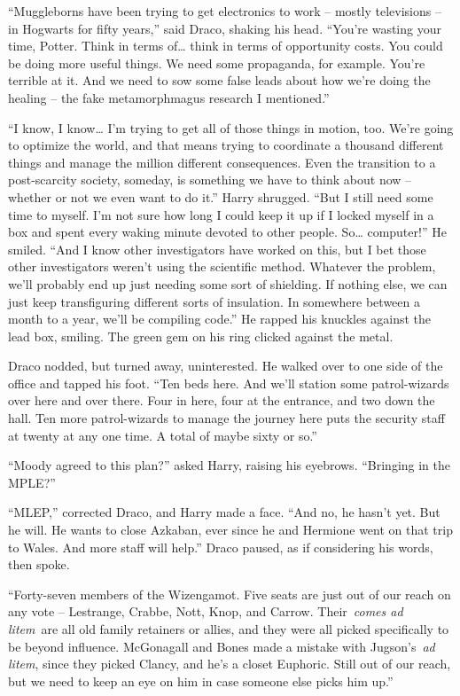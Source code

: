 ``Muggleborns have been trying to get electronics to work -- mostly
televisions -- in Hogwarts for fifty years,'' said Draco, shaking his
head. ``You're wasting your time, Potter. Think in terms of\ldots{}
think in terms of opportunity costs. You could be doing more useful
things. We need some propaganda, for example. You're terrible at it. And
we need to sow some false leads about how we're doing the healing -- the
fake metamorphmagus research I mentioned.''

``I know, I know\ldots{} I'm trying to get all of those things in
motion, too. We're going to optimize the world, and that means trying to
coordinate a thousand different things and manage the million different
consequences. Even the transition to a post-scarcity society, someday,
is something we have to think about now -- whether or not we even want
to do it.'' Harry shrugged. ``But I still need some time to myself. I'm
not sure how long I could keep it up if I locked myself in a box and
spent every waking minute devoted to other people. So\ldots{}
computer!'' He smiled. ``And I know other investigators have worked on
this, but I bet those other investigators weren't using the scientific
method. Whatever the problem, we'll probably end up just needing some
sort of shielding. If nothing else, we can just keep transfiguring
different sorts of insulation. In somewhere between a month to a year,
we'll be compiling code.'' He rapped his knuckles against the lead box,
smiling. The green gem on his ring clicked against the metal.

Draco nodded, but turned away, uninterested. He walked over to one side
of the office and tapped his foot. ``Ten beds here. And we'll station
some patrol-wizards over here and over there. Four in here, four at the
entrance, and two down the hall. Ten more patrol-wizards to manage the
journey here puts the security staff at twenty at any one time. A total
of maybe sixty or so.''

``Moody agreed to this plan?'' asked Harry, raising his eyebrows.
``Bringing in the MPLE?''

``MLEP,'' corrected Draco, and Harry made a face. ``And no, he hasn't
yet. But he will. He wants to close Azkaban, ever since he and Hermione
went on that trip to Wales. And more staff will help.'' Draco paused, as
if considering his words, then spoke.

``Forty-seven members of the Wizengamot. Five seats are just out of our
reach on any vote -- Lestrange, Crabbe, Nott, Knop, and Carrow.
Their~\emph{comes ad litem}~are all old family retainers or allies, and
they were all picked specifically to be beyond influence. McGonagall and
Bones made a mistake with Jugson's~\emph{ad litem}, since they picked
Clancy, and he's a closet Euphoric. Still out of our reach, but we need
to keep an eye on him in case someone else picks him up.''

